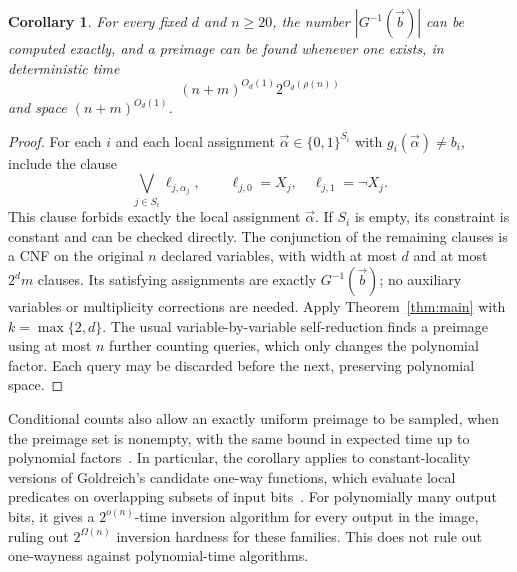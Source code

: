 \documentclass[11pt,reqno]{amsart}
\numberwithin{equation}{section}
\newtheorem{corollary}[theorem]{Corollary}
\theoremstyle{definition}\newtheorem{definition}[theorem]{Definition}
\theoremstyle{remark}\newtheorem{remark}[theorem]{Remark}
\renewcommand{\ge}{\geqslant}
\begin{document}
\begin{corollary}\label{cor:consequence-local-inversion}
For every fixed $d$ and $n\ge20$, the number
$|G^{-1}(\vec{b})|$ can be computed exactly, and a preimage can be
found whenever one exists, in deterministic time
\[
 (n+m)^{O_d(1)}2^{O_d(\rho(n))}
\]
and space $(n+m)^{O_d(1)}$.
\end{corollary}
\begin{proof}
For each $i$ and each local assignment
$\vec{\alpha}\in\{0,1\}^{S_i}$ with $g_i(\vec{\alpha})\ne b_i$,
include the clause
\[
 \bigvee_{j\in S_i}\ell_{j,\alpha_j},
 \qquad
 \ell_{j,0}=X_j,\quad \ell_{j,1}=\neg X_j.
\]
This clause forbids exactly the local assignment $\vec{\alpha}$.
If $S_i$ is empty, its constraint is constant and can be checked
directly. The conjunction of the remaining clauses is a CNF on the
original $n$ declared variables, with width at most $d$ and at most
$2^d m$ clauses. Its satisfying assignments are exactly
$G^{-1}(\vec{b})$; no auxiliary variables or multiplicity corrections
are needed. Apply Theorem~\ref{thm:main} with $k=\max\{2,d\}$.
The usual variable-by-variable self-reduction finds a preimage using
at most $n$ further counting queries, which only changes the
polynomial factor. Each query may be discarded before the next,
preserving polynomial space.
\end{proof}

Conditional counts also allow an exactly uniform preimage to be
sampled, when the preimage set is nonempty, with the same bound in
expected time up to polynomial factors~\cite{JVV86}.
In particular, the corollary applies to constant-locality versions
of Goldreich's candidate one-way functions, which evaluate local
predicates on overlapping subsets of input bits~\cite{Gol00}.
For polynomially many output bits, it gives a $2^{o(n)}$-time
inversion algorithm for every output in the image, ruling out
$2^{\Omega(n)}$ inversion hardness for these families. This does not
rule out one-wayness against polynomial-time algorithms.



\end{document}
